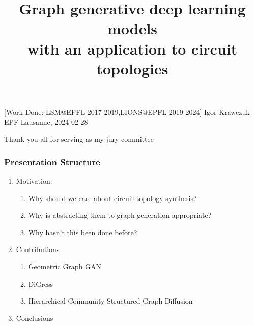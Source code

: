 \documentclass[11pt,
xcolor={dvipsnames},
hyperref={pdftex,pdfpagemode=UseNone,hidelinks,pdfdisplaydoctitle=true},
usepdftitle=false,
aspectratio=169]{beamer}
\begin{document}
\title{\justifying Graph generative deep learning models\\ with an application to circuit topologies}
\information%
[Work Done: LSM@EPFL 2017-2019,LIONS@EPFL 2019-2024]%
{Igor Krawczuk}%
{EPF Lausanne,  2024-02-28}
\frame[label=title]{\titlepage}
\begin{frame}[label=done,c]
  \centering
  \Huge Thank you all for serving as my jury committee
\end{frame}


\begin{frame}[label=done]
  \frametitle{Presentation Structure}
  \centering
  \begin{enumerate}
    \item Motivation:
      \begin{enumerate}
        \item Why should we care about circuit topology synthesis?
        \item Why is  abstracting them to graph generation appropriate?
        \item Why hasn't this been done before?
      \end{enumerate}
    \item Contributions
      \begin{enumerate}
        \item Geometric Graph GAN
        \item DiGress
        \item Hierarchical Community Structured Graph Diffusion
      \end{enumerate}
    \item Conclusions %
  \end{enumerate} 
  \vspace{1cm} %
\end{frame}
\end{document}
